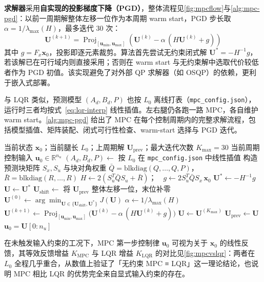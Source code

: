 \documentclass{smbuthesis}
\DeclareMathOperator{\Proj}{Proj}
\begin{document}
\textbf{求解器}采用\textbf{自实现的投影梯度下降（PGD）}，整体流程见\cref{fig:mpcflow}与\cref{alg:mpc-pgd}：以前一周期解整体左移一位作为本周期 warm start，PGD 步长取 $\alpha = 1/\lambda_{\max}(H)$，最多迭代 30 次：
\begin{equation}
\label{eq:pgd}
\mathbf{U}^{(k+1)} = \Proj_{[\mathbf{u}_{\min}, \mathbf{u}_{\max}]}\!\left(\mathbf{U}^{(k)} - \alpha\,(H\mathbf{U}^{(k)} + g)\right)
\end{equation}
其中 $g = F_x \mathbf{x}_0$，投影即逐元素裁剪。算法首先尝试无约束闭式解 $\mathbf{U}^* = -H^{-1}g$，若该解已在可行域内则直接采用；否则在 warm start 与无约束解中选取代价较低者作为 PGD 初值。该实现避免了对外部 QP 求解器（如 OSQP）的依赖，更利于嵌入式部署。

与 LQR 类似，预测模型 $(A_d, B_d, P)$ 也按 $L_0$ 离线打表（\texttt{mpc\_config.json}），运行时三者均按式~\eqref{eq:lqr-interp} 线性插值。左右腿仍各跑一路 MPC，各自维护 warm start。\cref{alg:mpc-pgd} 给出了 MPC 在每个控制周期内的完整求解流程，包括模型插值、矩阵装配、闭式可行性检查、warm-start 选择与 PGD 迭代。

\begin{algorithm}[H]
\caption{MPC condensed-QP + PGD 单步求解}\label{alg:mpc-pgd}
\begin{algorithmic}[1]
\REQUIRE 当前状态 $\mathbf{x}_0$；当前腿长 $L_0$；上周期解 $\mathbf{U}_\mathrm{prev}$；最大迭代次数 $K_\mathrm{max} = 30$
\ENSURE 当前周期控制输入 $\mathbf{u}_0 \in \mathbb{R}^{n_u}$
\STATE $(A_d, B_d, P) \leftarrow$ 按 $L_0$ 在 \texttt{mpc\_config.json} 中线性插值
\STATE 构造预测块矩阵 $S_x, S_u$ 与块对角权重 $\bar Q = \mathrm{blkdiag}(Q,\dots,Q,P)$，$\bar R = \mathrm{blkdiag}(R,\dots,R)$
\STATE $H \leftarrow 2(S_u^T \bar Q S_u + \bar R)$；$\quad g \leftarrow 2 S_u^T \bar Q S_x\, \mathbf{x}_0$
\STATE $\mathbf{U}^* \leftarrow -H^{-1} g$ 
  \STATE $\mathbf{U} \leftarrow \mathbf{U}^*$ 
\ELSE
  \STATE $\mathbf{U}_\mathrm{shift} \leftarrow$ 将 $\mathbf{U}_\mathrm{prev}$ 整体左移一位，末位补零 
  \STATE $\mathbf{U}^{(0)} \leftarrow \arg\min_{\mathbf{U} \in \{\mathbf{U}_\mathrm{shift}, \mathbf{U}^*\}} J(\mathbf{U})$
  \STATE $\alpha \leftarrow 1 / \lambda_\mathrm{max}(H)$
    \STATE $\mathbf{U}^{(k+1)} \leftarrow \Proj_{[\mathbf{u}_\mathrm{min}, \mathbf{u}_\mathrm{max}]}\bigl(\mathbf{U}^{(k)} - \alpha\,(H \mathbf{U}^{(k)} + g)\bigr)$
  \ENDFOR
  \STATE $\mathbf{U} \leftarrow \mathbf{U}^{(K_\mathrm{max})}$
\ENDIF
\STATE $\mathbf{U}_\mathrm{prev} \leftarrow \mathbf{U}$ 
\RETURN $\mathbf{u}_0 = \mathbf{U}[0:n_u]$
\end{algorithmic}
\end{algorithm}在未触发输入约束的工况下，MPC 第一步控制律 $\mathbf{u}_0$ 可视为关于 $\mathbf{x}_0$ 的线性反馈，其等效反馈增益 $K_\mathrm{MPC}$ 与 LQR 增益 $K_\mathrm{LQR}$ 的对比见\cref{fig:mpcvslqr}：两者在 $L_0$ 全程几乎重合，从数值上验证了「无约束 MPC ≡ LQR」这一理论结论，也说明 MPC 相比 LQR 的优势完全来自显式输入约束的存在。
\end{document}
